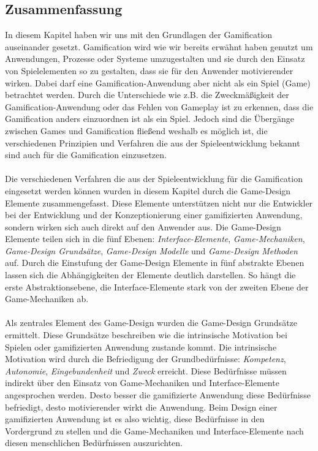 \documentclass[a4paper,12pt,twoside]{scrartcl}
\begin{document}
\subsection{Zusammenfassung}
In diesem Kapitel haben wir uns mit den Grundlagen der Gamification auseinander gesetzt. Gamification wird wie wir bereits erwähnt haben genutzt um Anwendungen, Prozesse oder Systeme umzugestalten und sie durch den Einsatz von Spielelementen so zu gestalten, dass sie für den Anwender motivierender wirken. Dabei darf eine Gamification-Anwendung aber nicht als ein Spiel (Game) betrachtet werden. Durch die Unterschiede wie z.B. die Zweckmäßigkeit der Gamification-Anwendung oder das Fehlen von Gameplay ist zu erkennen, dass die Gamification anders einzuordnen ist als ein Spiel. Jedoch sind die Übergänge zwischen Games und Gamification fließend weshalb es möglich ist, die verschiedenen Prinzipien und Verfahren die aus der Spieleentwicklung bekannt sind auch für die Gamification einzusetzen.
\\\\
Die verschiedenen Verfahren die aus der Spieleentwicklung für die Gamification eingesetzt werden können wurden in diesem Kapitel durch die Game-Design Elemente zusammengefasst. Diese Elemente unterstützen nicht nur die Entwickler bei der Entwicklung und der Konzeptionierung einer gamifizierten Anwendung, sondern wirken sich auch direkt auf den Anwender aus. Die Game-Design Elemente teilen sich in die fünf Ebenen: \textit{Interface-Elemente}, \textit{Game-Mechaniken}, \textit{Game-Design Grundsätze}, \textit{Game-Design Modelle} und \textit{Game-Design Methoden} auf. Durch die Einstufung der Game-Design Elemente in fünf abstrakte Ebenen lassen sich die Abhängigkeiten der Elemente deutlich darstellen. So hängt die erste Abstraktionsebene, die Interface-Elemente stark von der zweiten Ebene der Game-Mechaniken ab.
\\\\
Als zentrales Element des Game-Design wurden die Game-Design Grundsätze ermittelt. Diese Grundsätze beschreiben wie die intrinsische Motivation bei Spielen oder gamifizierten Anwendung zustande kommt. Die intrinsische Motivation wird durch  die Befriedigung der Grundbedürfnisse: \textit{Kompetenz}, \textit{Autonomie}, \textit{Eingebundenheit} und \textit{Zweck} erreicht. Diese Bedürfnisse müssen indirekt über den Einsatz von Game-Mechaniken und Interface-Elemente angesprochen werden. Desto besser die gamifizierte Anwendung diese Bedürfnisse befriedigt, desto motivierender wirkt die Anwendung. Beim Design einer gamifizierten Anwendung ist es also wichtig, diese Bedürfnisse in den Vordergrund zu stellen und die Game-Mechaniken und Interface-Elemente nach diesen menschlichen Bedürfnissen auszurichten.
\end{document}
